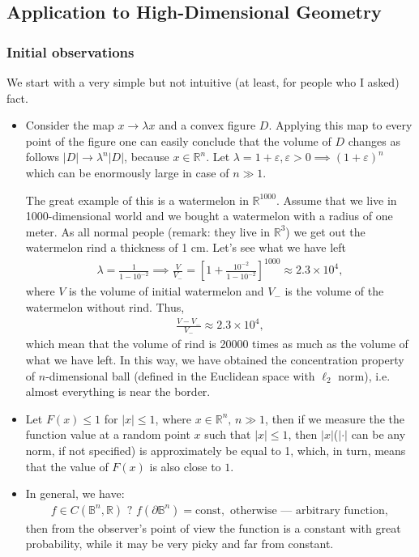 \subsection{Application to High-Dimensional Geometry}
\subsubsection{Initial observations}
We start with a very simple but not intuitive (at least, for people who I asked) fact.
\begin{itemize}
\item Consider the map $x \to \lambda x$ and a convex figure $D$. Applying this map to every point of the figure one can easily conclude that the volume of $D$ changes as follows $|D| \to \lambda^n |D|$, because $x \in \mathbb{R}^n$. Let $\lambda = 1 + \varepsilon, \varepsilon > 0 \implies (1+\varepsilon)^n$ which can be enormously large in case of $n \gg 1$. 
\par The great example of this is a watermelon in $\mathbb{R}^{1000}$. Assume that we live in 1000-dimensional world and we bought a watermelon with a radius of one meter. As all normal people (remark: they live in $\mathbb{R}^3$) we get out the watermelon rind a thickness of 1 cm. Let's see what we have left 
\begin{eqnarray}
\lambda = \frac 1 {1- 10^{-2}} \implies \frac V {V_-} = \left[1 + \frac {10^{-2}}{1 - 10^{-2}}\right]^{1000} \approx 2.3 \times 10^4,
\end{eqnarray}
where $V$ is the volume of initial watermelon and $V_-$ is the volume of the watermelon without rind. Thus,
\begin{eqnarray}
\frac {V - V_-}{V_-} \approx 2.3 \times 10^4,
\end{eqnarray}
which mean that the volume of rind is 20000 times as much as the volume of what we have left. In this way, we have obtained the concentration property of $n$-dimensional ball (defined in the Euclidean space with $\ell_2$ norm), i.e. almost everything is near the border. 
\item Let $F(x) \le 1$ for $|x| \le 1$, where $x \in \mathbb{R}^n, \, n \gg 1$, then if we measure the the function value at a random point $x$ such that $|x| \le 1$, then $|x|$($|\cdot|$ can be any norm, if not specified) is approximately be equal to 1, which, in turn, means that the value of $F(x)$ is also close to $1$. 
\item In general, we have:
\begin{eqnarray}
f \in C(\mathbb{B}^n, \mathbb{R})\text{ ? } f(\partial \mathbb{B}^n) = \text{const}, \text{ otherwise --- arbitrary function},
\end{eqnarray}
then from the observer's point of view the function is a constant with great probability, while it may be very picky and far from constant. 
\end{itemize}
